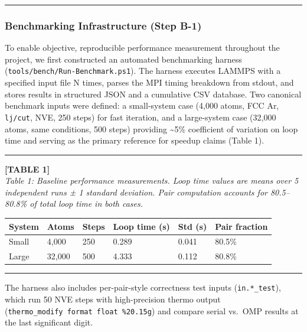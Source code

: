 \documentclass[
  11pt,
]{article}
\newcounter{none} %
\begin{document}
\begin{center}\rule{0.5\linewidth}{0.5pt}\end{center}

\subsubsection{Benchmarking Infrastructure (Step
B-1)}\label{benchmarking-infrastructure-step-b-1}

To enable objective, reproducible performance measurement throughout the
project, we first constructed an automated benchmarking harness
(\texttt{tools/bench/Run-Benchmark.ps1}). The harness executes LAMMPS
with a specified input file N times, parses the MPI timing breakdown
from stdout, and stores results in structured JSON and a cumulative CSV
database. Two canonical benchmark inputs were defined: a small-system
case (4,000 atoms, FCC Ar, \texttt{lj/cut}, NVE, 250 steps) for fast
iteration, and a large-system case (32,000 atoms, same conditions, 500
steps) providing \textasciitilde5\% coefficient of variation on loop
time and serving as the primary reference for speedup claims (Table 1).

\begin{center}\rule{0.5\linewidth}{0.5pt}\end{center}

\textbf{{[}TABLE 1{]}}\\
\emph{Table 1: Baseline performance measurements. Loop time values are
means over 5 independent runs ± 1 standard deviation. Pair computation
accounts for 80.5--80.8\% of total loop time in both cases.}

{\def\LTcaptype{none} %
\begin{longtable}[]{@{}llllll@{}}
\toprule\noalign{}
System & Atoms & Steps & Loop time (s) & Std (s) & Pair fraction \\
\midrule\noalign{}
\endhead
\bottomrule\noalign{}
\endlastfoot
Small & 4,000 & 250 & 0.289 & 0.041 & 80.5\% \\
Large & 32,000 & 500 & 4.333 & 0.112 & 80.8\% \\
\end{longtable}
}

\begin{center}\rule{0.5\linewidth}{0.5pt}\end{center}

The harness also includes per-pair-style correctness test inputs
(\texttt{in.*\_test}), which run 50 NVE steps with high-precision thermo
output (\texttt{thermo\_modify\ format\ float\ \%20.15g}) and compare
serial vs.~OMP results at the last significant digit.
\end{document}
